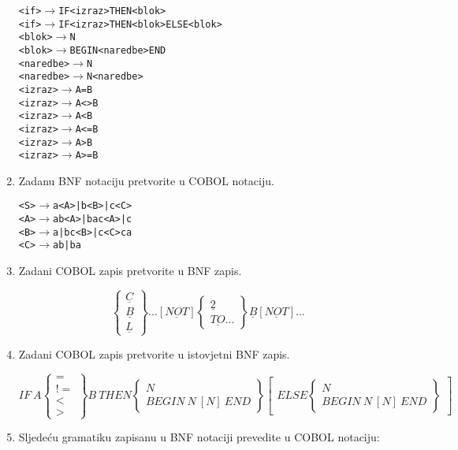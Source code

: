 \documentclass[times, 12pt, utf8]{book}
\begin{document}
\begin{enumerate}[resume]
\begin{alltt}
<if> \(\to\) IF <izraz> THEN <blok>
<if> \(\to\) IF <izraz> THEN <blok> ELSE <blok>
<blok> \(\to\) N
<blok> \(\to\) BEGIN <naredbe> END
<naredbe> \(\to\) N
<naredbe> \(\to\) N <naredbe>
<izraz> \(\to\) A=B
<izraz> \(\to\) A<>B
<izraz> \(\to\) A<B
<izraz> \(\to\) A<=B
<izraz> \(\to\) A>B
<izraz> \(\to\) A>=B
\end{alltt} 

\item
Zadanu BNF notaciju pretvorite u COBOL notaciju. \cite[str.~81-82]{udzbenik}

\begin{alltt}
<S> \(\to\) a<A> | b<B> | c<C>
<A> \(\to\) ab<A> | bac<A> | c
<B> \(\to\) a | bc<B> | c<C>ca
<C> \(\to\) ab | ba
\end{alltt}

\item
Zadani COBOL zapis pretvorite u BNF zapis. \cite[str.~81-82]{udzbenik}

\[
\begin{Bmatrix}
\underline{C} \\ 
\underline{B} \\ 
\underline{L}
\end{Bmatrix}
...
[\underline{NOT}]
\begin{Bmatrix}
\underline{2}\\ 
\underline{TO}...
\end{Bmatrix}
\underline{B}
[\underline{NOT}]
...
\] 

\item
Zadani COBOL zapis pretvorite u istovjetni BNF zapis. \cite[str.~81-82]{udzbenik}

\[
IF \ A \begin{Bmatrix}
= \\ 
!= \\ 
< \\ 
>
\end{Bmatrix}
B \ THEN
\begin{Bmatrix}
N\\ 
BEGIN \ N \ [N] \ END
\end{Bmatrix}
\begin{bmatrix}
ELSE \begin{Bmatrix}
N\\ 
BEGIN \ N \ [N] \ END
\end{Bmatrix}
\end{bmatrix}
\] 

\item
Sljedeću gramatiku zapisanu u BNF notaciji prevedite u COBOL notaciju: \cite[str.~81-82]{udzbenik}


\end{enumerate}
\end{document}
